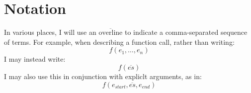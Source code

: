 \section{Notation}

In various places, I will use an \(\overline{\text{overline}}\) to
indicate a comma-separated sequence of terms.  For example, when
describing a function call, rather than writing:
\[
f(e_{1},\ldots,e_{n})
\]
I may instead write:
\[
f(\overline{es})
\]
I may also use this in conjunction with expliclt arguments, as in:
\[
f(e_{start},\overline{es},e_{end})
\]

